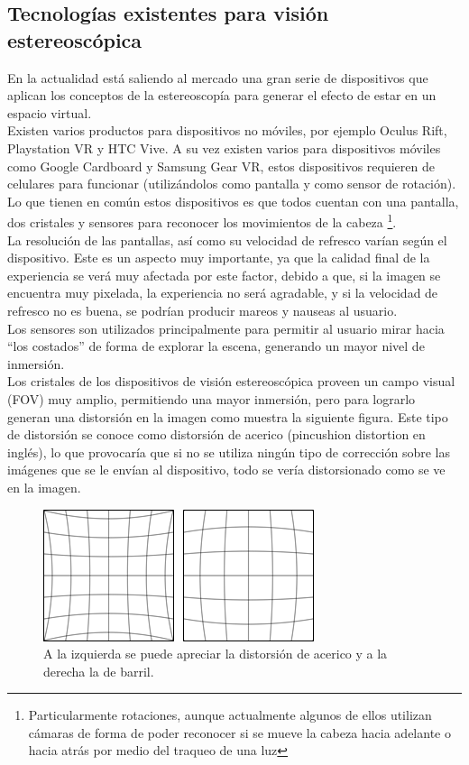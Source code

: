 \documentclass[12pt]{article}
\begin{document}
\subsection{Tecnologías existentes para visión estereoscópica}
En la actualidad está saliendo al mercado una gran serie de dispositivos que aplican los conceptos de la estereoscopía para generar el efecto de estar en un espacio virtual.
\\Existen varios productos para dispositivos no móviles, por ejemplo  Oculus Rift\cite{oculus}, Playstation VR\cite{psvr} y HTC Vive\cite{htcvive}. A su vez existen varios para dispositivos móviles como  Google Cardboard\cite{cardboard} y  Samsung Gear VR\cite{samsungvr}, estos dispositivos requieren de celulares para funcionar (utilizándolos como pantalla y como sensor de rotación).
\\Lo que tienen en común estos dispositivos es que todos cuentan con una pantalla, dos cristales y sensores para reconocer los movimientos de la cabeza \footnote{Particularmente rotaciones, aunque actualmente algunos de ellos utilizan cámaras de forma de poder reconocer si se mueve la cabeza hacia adelante o hacia atrás por medio del traqueo de una luz}.
\\La resolución de las pantallas, así como su velocidad de refresco varían según el dispositivo. Este es un aspecto muy importante, ya que la calidad final de la experiencia se verá muy afectada por este factor, debido a que, si la imagen se encuentra muy pixelada, la experiencia no será agradable, y si la velocidad de refresco no es buena, se podrían producir mareos y nauseas al usuario.
\\Los sensores son utilizados principalmente para permitir al usuario mirar hacia “los costados” de forma de explorar la escena, generando un mayor nivel de inmersión.
\\Los cristales de los dispositivos de visión estereoscópica proveen un campo visual (FOV) muy amplio, permitiendo una mayor inmersión, pero para lograrlo generan una distorsión\cite{oculusrendering} en la imagen como muestra la siguiente figura. Este tipo de distorsión se conoce como  distorsión de acerico (pincushion distortion en inglés), lo que provocaría que si no se utiliza ningún tipo de corrección sobre las imágenes que se le envían al dispositivo, todo se vería distorsionado como se ve en la imagen.
\begin{figure}[h!]
\includegraphics[width =0.6\linewidth, center]{ace-bar.png}
\caption{ A la izquierda se puede apreciar la distorsión de acerico y a la derecha la de barril.}
\label{ fig : surface }
\end{figure}
\end{document}
